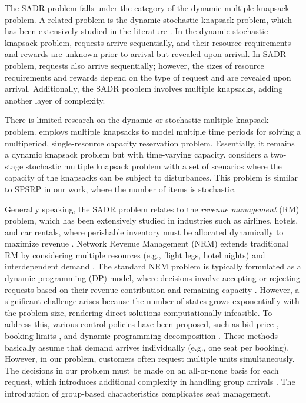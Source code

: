 The SADR problem falls under the category of the dynamic multiple knapsack problem. A related problem is the dynamic stochastic knapsack problem, which has been extensively studied in the literature \citep{kleywegt1998dynamic, kleywegt2001dynamic, papastavrou1996dynamic}. In the dynamic stochastic knapsack problem, requests arrive sequentially, and their resource requirements and rewards are unknown prior to arrival but revealed upon arrival. In SADR problem, requests also arrive sequentially; however, the sizes of resource requirements and rewards depend on the type of request and are revealed upon arrival. Additionally, the SADR problem involves multiple knapsacks, adding another layer of complexity.


There is limited research on the dynamic or stochastic multiple knapsack problem. \citep{perry2009approximate} employs multiple knapsacks to model multiple time periods for solving a multiperiod, single-resource capacity reservation problem. Essentially, it remains a dynamic knapsack problem but with time-varying capacity. \citep{tonissen2017column} considers a two-stage stochastic multiple knapsack problem with a set of scenarios where the capacity of the knapsacks can be subject to disturbances. This problem is similar to SPSRP in our work, where the number of items is stochastic.


Generally speaking, the SADR problem relates to the \textit{revenue management} (RM) problem, which has been extensively studied in industries such as airlines, hotels, and car rentals, where perishable inventory must be allocated dynamically to maximize revenue \citep{van2005introduction}. Network Revenue Management (NRM) extends traditional RM by considering multiple resources (e.g., flight legs, hotel nights) and interdependent demand \citep{williamson1992airline}. The standard NRM problem is typically formulated as a dynamic programming (DP) model, where decisions involve accepting or rejecting requests based on their revenue contribution and remaining capacity \citep{talluri1998analysis}. However, a significant challenge arises because the number of states grows exponentially with the problem size, rendering direct solutions computationally infeasible. To address this, various control policies have been proposed, such as bid-price \citep{adelman2007dynamic, bertsimas2003revenue}, booking limits \citep{gallego1997multiproduct}, and dynamic programming decomposition \citep{talluri2006theory, liu2008choice}. These methods basically assume that demand arrives individually (e.g., one seat per booking). However, in our problem, customers often request multiple units simultaneously. The decisions in our problem must be made on an all-or-none basis for each request, which introduces additional complexity in handling group arrivals \citep{talluri2006theory}. The introduction of group-based characteristics complicates seat management.


